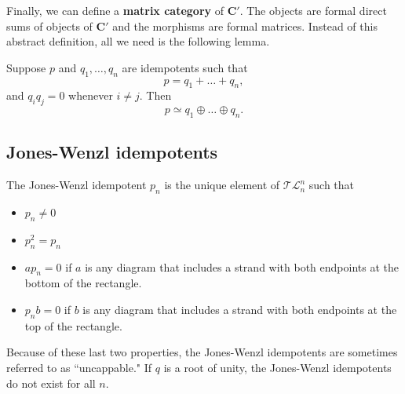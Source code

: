 Finally,
we can define a {\bf matrix category} of $\mathbf{C}'$.
The objects are formal direct sums of objects of $\mathbf{C}'$
and the morphisms are formal matrices.
Instead of this abstract definition,
all we need is the following lemma.

\begin{lem} \label{lem:dirSum}
Suppose $p$ and $q_1,\dots,q_n$ are idempotents such that
$$p = q_1 + \dots + q_n,$$
and $q_i q_j = 0$ whenever $i \neq j$.
Then 
$$p \simeq q_1 \oplus \dots \oplus q_n.$$
\end{lem}

\subsection{Jones-Wenzl idempotents}

The Jones-Wenzl idempotent $p_n$
is the unique element of $\mathcal{TL}^n_n$
such that
\begin{itemize}
\item $p_n \neq 0$
\item $p_n^2 = p_n$
\item $a p_n = 0$ if $a$ is any diagram
      that includes a strand with both endpoints at the bottom of the rectangle.
\item $p_n b = 0$ if $b$ is any diagram
      that includes a strand with both endpoints at the top of the rectangle.
\end{itemize}


Because of these last two properties, the Jones-Wenzl idempotents are sometimes referred to as ``uncappable."
If $q$ is a root of unity,
the Jones-Wenzl idempotents do not exist for all $n$.





